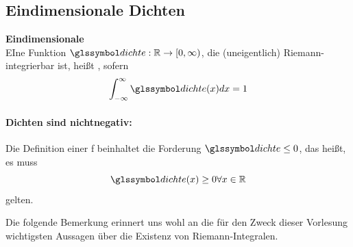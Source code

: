 \subsection{Eindimensionale Dichten}\label{subsec:eindimensionale-dichten}
\begin{defi}
    \label{def:dichte}
    \textbf{Eindimensionale \dichte}  \\
    EIne Funktion $\dcht : \mathbb{R} \rightarrow [0, \infty)$, die (uneigentlich) Riemann-integrierbar ist, heißt
    \underline{\dichte}, sofern
    \[
        \int_{- \infty}^{\infty}\dcht  (x) dx = 1
    \]
\end{defi}

\begin{bem}
      

    \paragraph{Dichten sind nichtnegativ:} Die Definition einer \dichte f beinhaltet die Forderung
    $\dcht \leq 0$, das heißt,
    es muss
    \[
        \dcht (x) \geq 0 \forall x \in \rz
    \]
    gelten.
\end{bem}
Die folgende Bemerkung erinnert uns wohl an die für den Zweck dieser Vorlesung wichtigsten Aussagen über
die Existenz von Riemann-Integralen.
